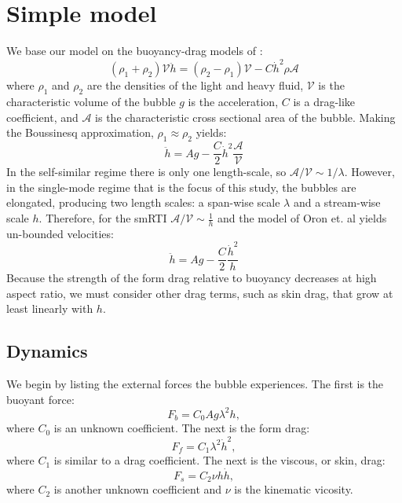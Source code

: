 \section{Simple model} 

We base our model on the buoyancy-drag models of \cite{Oron2001}:
\begin{equation}
(\rho_1 + \rho_2) \mathcal{V} \ddot{h} = (\rho_2 - \rho_1) \mathcal{V} - C \dot{h}^2 \rho \mathcal{A}
\end{equation}
where $\rho_1$ and $\rho_2$ are the densities of the light and heavy fluid,
$\mathcal{V}$ is the characteristic volume of the bubble
$g$ is the acceleration,
$C$ is a drag-like coefficient, and
$\mathcal{A}$ is the characteristic cross sectional area of the bubble.
Making the Boussinesq approximation, $\rho_1 \approx \rho_2$ yields:
\begin{equation}
\ddot{h} = A g - \frac{C}{2} \dot{h}^2 \frac{\mathcal{A}}{\mathcal{V}}
\end{equation}
In the self-similar regime there is only one length-scale, so $\mathcal{A}/\mathcal{V} \sim 1 / \lambda$.
However, in the single-mode regime that is the focus of this study, the bubbles are elongated, producing two length scales: a span-wise scale $\lambda$ and a stream-wise scale $h$.
Therefore, for the smRTI $\mathcal{A}/\mathcal{V} \sim \frac{1}{h}$ and the model of Oron et. al yields un-bounded velocities:
\begin{equation}
\ddot{h} = A g - \frac{C}{2} \frac{\dot{h}^2}{h}
\end{equation}
Because the strength of the form drag relative to buoyancy decreases at high aspect ratio, we must consider other drag terms, such as skin drag, that grow at least linearly with $h$.

\subsection{Dynamics}

We begin by listing the external forces the bubble experiences.  The first is the buoyant force:
\begin{equation}
F_b = C_0 A g \lambda^2 h,
\end{equation}
where $C_0$ is an unknown coefficient.
The next is the form drag:
\begin{equation}
F_f = C_1 \lambda^2 \dot{h}^2,
\end{equation}
where $C_1$ is similar to a drag coefficient.
The next is the viscous, or skin, drag:
\begin{equation}
F_s = C_2 \nu h \dot{h},
\end{equation}
where $C_2$ is another unknown coefficient and 
$\nu$ is the kinematic vicosity.

